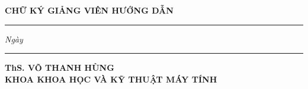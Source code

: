\clearpage
\thispagestyle{empty}

\begin{center}
    \textbf{\LARGE CHỮ KÝ GIẢNG VIÊN HƯỚNG DẪN}
\end{center}

\vspace{5.2cm}

\noindent
\hspace{0.9cm}%
\rule{0.50\textwidth}{0.4pt}%
\hspace{0.4cm}%
\textit{Ngày}%
\hspace{0.4cm}%
\rule{0.25\textwidth}{0.4pt}

\vspace{1.1cm}

\noindent
\textbf{ThS. VÕ THANH HÙNG}\\
\textbf{KHOA KHOA HỌC VÀ KỸ THUẬT MÁY TÍNH}

\clearpage
